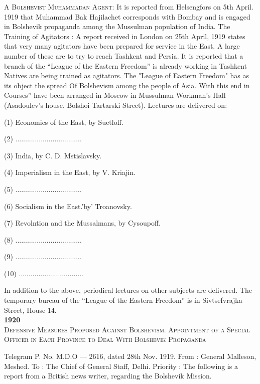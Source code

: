 \textsc{A Bolshevist Muhammadan Agent:} It is reported from Helsengfors on 5th April. 1919 that Muhammad Bak Hajilachet corresponds with Bombay and is engaged in Bolshevik propaganda among the Mussulman population of India. The Training of Agitators : A report received in London on 25th April, 1919 states that very many agitators have been prepared for service in the East. A large number of these are to try to reach Tashkent and Persia. It is reported that a branch of the “League of the Eastern Freedom” is already working in Tashkent Natives are being trained as agitators. The "League of Eastern Freedom" has as its object the spread Of Bolshevism among the people of Asia. With this end in Courses” have been arranged in Moscow in Mussulman Workman's Hall (Asadoulev's house, Bolshoi Tartarski Street). Lectures are delivered on:

(1) Economics of the East, by Suetloff.

(2) .................................. 

(3) India, by C. D. Mstislavsky. 

(4) Imperialism in the East, by V. Kriajin. 

(5) ..................................

(6) Socialism in the East.'by' Troanovsky. 

(7) Revolntion and the Mussalmans, by Cysoupoff. 

(8) ..................................

(9) ..................................

(10) .................................

In addition to the above, periodical lectures on other subjects are delivered. The temporary bureau of the “League of the Eastern Freedom” is in Sivtsefvrajka Street, House 14. \\

\textbf{1920}\\

\textsc{Defensive Measures Proposed Against Bolshevism. Appointment of a Special Officer in Each Province to Deal With Bolshevik Propaganda}

Telegram P. No. M.D.O — 2616, dated 28th Nov. 1919. 
From : General Malleson, Meshed. 
To : The Chief of General Staff, Delhi. 
Priority : The following is a report from a British news writer, regarding the Bolshevik Mission. 

